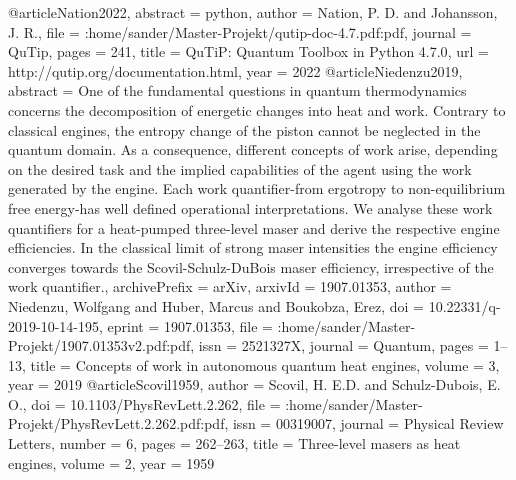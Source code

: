 \documentclass[12pt,a4paper]{article}
\begin{document}
@article{Nation2022,
abstract = {python},
author = {Nation, P. D. and Johansson, J. R.},
file = {:home/sander/Master-Projekt/qutip-doc-4.7.pdf:pdf},
journal = {QuTip},
pages = {241},
title = {{QuTiP: Quantum Toolbox in Python 4.7.0}},
url = {http://qutip.org/documentation.html},
year = {2022}
}
@article{Niedenzu2019,
abstract = {One of the fundamental questions in quantum thermodynamics concerns the decomposition of energetic changes into heat and work. Contrary to classical engines, the entropy change of the piston cannot be neglected in the quantum domain. As a consequence, different concepts of work arise, depending on the desired task and the implied capabilities of the agent using the work generated by the engine. Each work quantifier-from ergotropy to non-equilibrium free energy-has well defined operational interpretations. We analyse these work quantifiers for a heat-pumped three-level maser and derive the respective engine efficiencies. In the classical limit of strong maser intensities the engine efficiency converges towards the Scovil-Schulz-DuBois maser efficiency, irrespective of the work quantifier.},
archivePrefix = {arXiv},
arxivId = {1907.01353},
author = {Niedenzu, Wolfgang and Huber, Marcus and Boukobza, Erez},
doi = {10.22331/q-2019-10-14-195},
eprint = {1907.01353},
file = {:home/sander/Master-Projekt/1907.01353v2.pdf:pdf},
issn = {2521327X},
journal = {Quantum},
pages = {1--13},
title = {{Concepts of work in autonomous quantum heat engines}},
volume = {3},
year = {2019}
}
@article{Scovil1959,
author = {Scovil, H. E.D. and Schulz-Dubois, E. O.},
doi = {10.1103/PhysRevLett.2.262},
file = {:home/sander/Master-Projekt/PhysRevLett.2.262.pdf:pdf},
issn = {00319007},
journal = {Physical Review Letters},
number = {6},
pages = {262--263},
title = {{Three-level masers as heat engines}},
volume = {2},
year = {1959}
}
\end{document}
